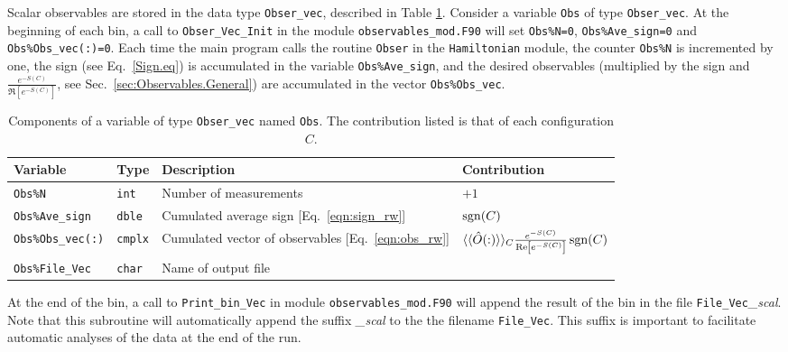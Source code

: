 Scalar observables are stored in the data type \texttt{Obser\_vec}, described in Table \ref{table:Obser_vec}. Consider  a variable \texttt{Obs} of type  \texttt{Obser\_vec}.  At the beginning of each bin,  a call to  \texttt{Obser\_Vec\_Init} in the module \texttt{observables\_mod.F90}  will  set   \texttt{Obs\%N=0},   \texttt{Obs\%Ave\_sign=0}  and  \texttt{Obs\%Obs\_vec(:)=0}.  Each time the main  program calls the routine \texttt{Obser}  in the  \texttt{Hamiltonian} module,  the counter \texttt{Obs\%N}   is incremented by one, the sign  (see Eq.~\ref{Sign.eq}) is accumulated in the  variable \texttt{Obs\%Ave\_sign},  and the desired observables (multiplied by the sign and   $\frac{e^{-S(C)}} {\Re \left[e^{-S(C)} \right]}$, see Sec.~\ref{sec:Observables.General})  are accumulated in the vector \texttt{Obs\%Obs\_vec}.  
%
\begin{table}[h!]
	\begin{center}
   \begin{tabular}{@{} p{} @{ } p{} p{} l @{}}\toprule
    Variable  &  Type      &  Description &  Contribution \\\midrule
    \texttt{Obs\%N}                       & \texttt{int}   &    Number of measurements &    $+1$ \\
    \texttt{Obs\%Ave\_sign}               & \texttt{dble}  &    Cumulated average sign [Eq.~\eqref{eqn:sign_rw}] & $\operatorname{sgn}(C)$  \\
    \texttt{Obs\%Obs\_vec(:)}  		      & \texttt{cmplx} &    Cumulated vector of observables [Eq.~\eqref{eqn:obs_rw}] &
           $ \langle \langle \hat{O}(:) \rangle \rangle_{C}\frac{e^{-S(C)}} {\operatorname{Re} \left[e^{-S(C)} \right]} \operatorname{sgn}(C) $ \\
     \texttt{Obs\%File\_Vec}           & \texttt{char}   &    Name of output file  &\\\bottomrule
   \end{tabular}
   \caption{Components of a variable of type \texttt{Obser\_vec} named \texttt{Obs}. The contribution listed is that of each configuration $C$.}
         \label{table:Obser_vec}
     \end{center}
\end{table}
%
At the end of the bin, a call to  \texttt{Print\_bin\_Vec}   in  module \texttt{observables\_mod.F90}  will  append the result of the bin in the file  \texttt{File\_Vec}\emph{\_scal}.  Note that this subroutine will automatically append the suffix \emph{\_scal} to the the filename \texttt{File\_Vec}.
This suffix  is important to facilitate automatic analyses of the data at the end of the run. 

